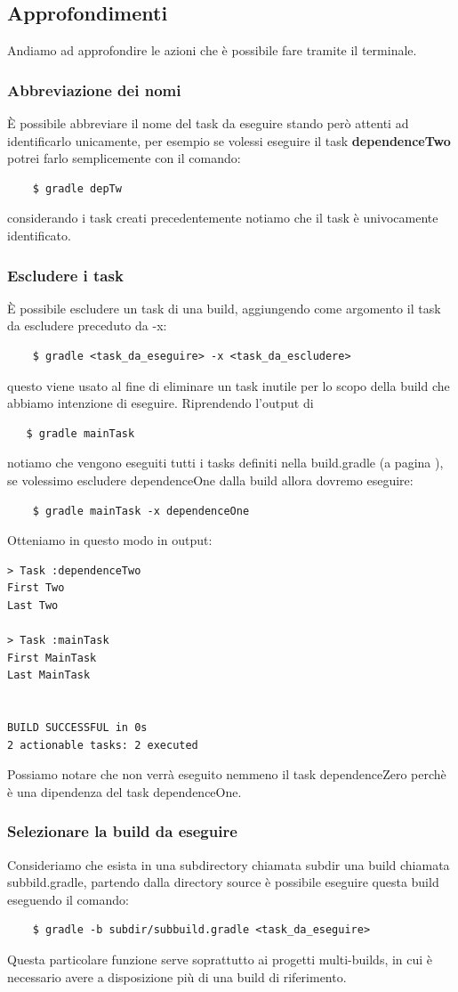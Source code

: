 \subsection{Approfondimenti}
Andiamo ad approfondire le azioni che è possibile fare tramite il terminale.

\subsubsection{Abbreviazione dei nomi}
È possibile abbreviare il nome del task da eseguire stando però attenti ad identificarlo unicamente, per esempio se volessi eseguire il task \textbf{dependenceTwo} potrei farlo semplicemente con il comando:
\begin{verbatim}
    $ gradle depTw \end{verbatim}
considerando i task creati precedentemente notiamo che il task è univocamente identificato.

\subsubsection{Escludere i task}
È possibile escludere un task di una build, aggiungendo come argomento il task da escludere preceduto da -x:
\begin{verbatim}
    $ gradle <task_da_eseguire> -x <task_da_escludere> \end{verbatim}
questo viene usato al fine di eliminare un task inutile per lo scopo della build che abbiamo intenzione di eseguire. Riprendendo l'output di \begin{verbatim}   $ gradle mainTask \end{verbatim} notiamo che vengono eseguiti tutti i tasks definiti nella build.gradle (a pagina \pageref{outMainTask}), se volessimo escludere dependenceOne dalla build allora dovremo eseguire:
\begin{verbatim}
    $ gradle mainTask -x dependenceOne \end{verbatim}
Otteniamo in questo modo in output:
\begin{verbatim}
> Task :dependenceTwo 
First Two
Last Two

> Task :mainTask 
First MainTask
Last MainTask


BUILD SUCCESSFUL in 0s
2 actionable tasks: 2 executed
\end{verbatim}
Possiamo notare che non verrà eseguito nemmeno il task dependenceZero perchè è una dipendenza del task dependenceOne.

\subsubsection{Selezionare la build da eseguire}
Consideriamo che esista in una subdirectory chiamata subdir una build chiamata subbild.gradle, partendo dalla directory source è possibile eseguire questa build eseguendo il comando:
\begin{verbatim}
    $ gradle -b subdir/subbuild.gradle <task_da_eseguire> \end{verbatim}
Questa particolare funzione serve soprattutto ai progetti multi-builds, in cui è necessario avere a disposizione più di una build di riferimento.

